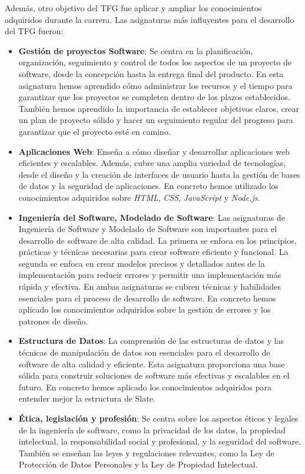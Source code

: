 Además, otro objetivo del TFG fue aplicar y ampliar los conocimientos adquiridos durante la carrera. Las asignaturas más influyentes para el desarrollo del TFG fueron:

\begin{itemize}
    \item \textbf{Gestión de proyectos Software}: Se centra en la planificación, organización, seguimiento y control de todos los aspectos de un proyecto de software, desde la concepción hasta la entrega final del producto. En esta asignatura hemos aprendido cómo administrar los recursos y el tiempo para garantizar que los proyectos se completen dentro de los plazos establecidos. También hemos aprendido la importancia de establecer objetivos claros, crear un plan de proyecto sólido y hacer un seguimiento regular del progreso para garantizar que el proyecto esté en camino.
    \item \textbf{Aplicaciones Web}: Enseña a cómo diseñar y desarrollar aplicaciones web eficientes y escalables. Además, cubre una amplia variedad de tecnologías, desde el diseño y la creación de interfaces de usuario hasta la gestión de bases de datos y la seguridad de aplicaciones. En concreto hemos utilizado los conocimientos adquiridos sobre \textit{HTML}, \textit{CSS}, \textit{JavaScript} y \textit{Node.js}.
    \item \textbf{Ingeniería del Software, Modelado de Software}: Las asignaturas de Ingeniería de Software y Modelado de Software son importantes para el desarrollo de software de alta calidad. La primera se enfoca en los principios, prácticas y técnicas necesarias para crear software eficiente y funcional. La segunda se enfoca en crear modelos precisos y detallados antes de la implementación para reducir errores y permitir una implementación más rápida y efectiva. En ambas asignaturas se cubren técnicas y habilidades esenciales para el proceso de desarrollo de software. En concreto hemos aplicado los conocimientos adquiridos sobre la gestión de errores y los patrones de diseño.
    \item \textbf{Estructura de Datos}: La comprensión de las estructuras de datos y las técnicas de manipulación de datos son esenciales para el desarrollo de software de alta calidad y eficiente. Esta asignatura proporciona una base sólida para construir soluciones de software más efectivas y escalables en el futuro. En concreto hemos aplicado los conocimientos adquiridos para entender mejor la estructura de Slate.
    \item \textbf{Ética, legislación y profesión}: Se centra sobre los aspectos éticos y legales de la ingeniería de software, como la privacidad de los datos, la propiedad intelectual, la responsabilidad social y profesional, y la seguridad del software. También se enseñan las leyes y regulaciones relevantes, como la Ley de Protección de Datos Personales y la Ley de Propiedad Intelectual.

\end{itemize}
